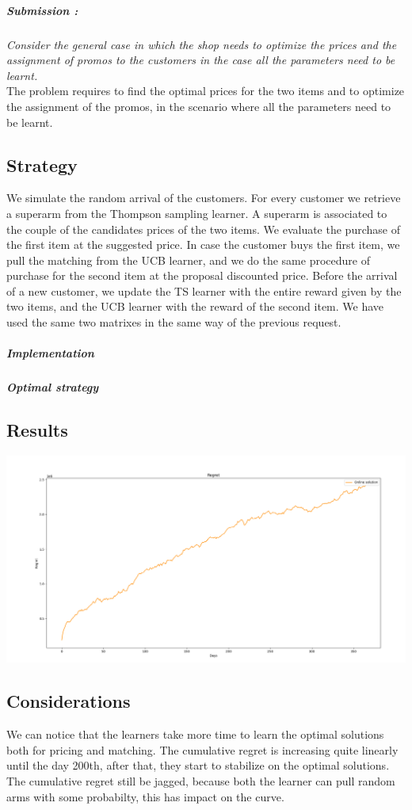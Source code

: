 \subparagraph*{Submission : }
\textit{Consider the general case in which the shop needs to optimize the prices and the assignment of promos to the customers in the case all the parameters need to be learnt.}\\

The problem requires to find the optimal prices for the two items and to optimize the assignment of the promos, in the scenario where all the parameters need to be learnt.

\subsection*{Strategy}
We simulate the random arrival of the customers. For every customer we retrieve a superarm from the Thompson sampling learner. A superarm is associated to the couple of the candidates prices of the two items. We evaluate the purchase of the first item at the suggested price. In case the customer buys the first item, we pull the matching from the UCB learner, and we do the same procedure of purchase for the second item at the proposal discounted price. Before the arrival of a new customer, we update the TS learner with the entire reward given by the two items, and the UCB learner with the reward of the second item. We have used the same two matrixes in the same way of the previous request.

\subparagraph{Implementation} 
\subparagraph{Optimal strategy}

\subsection*{Results}
\begin{center}
	\includegraphics[scale=0.35]{Images/n6}
\end{center}

\subsection*{Considerations}
We can notice that the learners take more time to learn the optimal solutions both for pricing and matching. The cumulative regret is increasing quite linearly until the day 200th, after that, they start to stabilize on the optimal solutions. The cumulative regret still be jagged, because both the learner can pull random arms with some probabilty, this has impact on the curve.